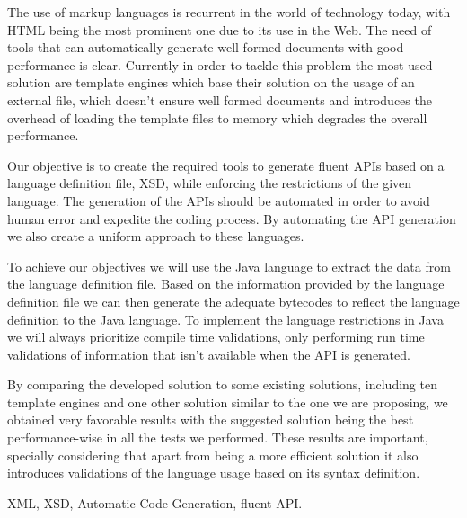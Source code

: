 \abstractEN %

The use of markup languages is recurrent in the world of technology today, with \ac{HTML} being the most prominent one due to its use in the Web. The need of tools that can automatically generate well formed documents with good performance is clear. Currently in order to tackle this problem the most used solution are template engines which base their solution on the usage of an external file, which doesn't ensure well formed documents and introduces the overhead of loading the template files to memory which degrades the overall performance.

\noindent
Our objective is to create the required tools to generate fluent \ac{API}s based on a language definition file, \ac{XSD}, while enforcing the restrictions of the given language. The generation of the \ac{API}s should be automated in order to avoid human error and expedite the coding process. By automating the \ac{API} generation we also create a uniform approach to these languages.  

\noindent
To achieve our objectives we will use the Java language to extract the data from the language definition file. Based on the information provided by the language definition file we can then generate the adequate bytecodes to reflect the language definition to the Java language. To implement the language restrictions in Java we will always prioritize compile time validations, only performing run time validations of information that isn't available when the \ac{API} is generated.

\noindent
By comparing the developed solution to some existing solutions, including ten template engines and one other solution similar to the one we are proposing, we obtained very favorable results with the suggested solution being the best performance-wise in all the tests we performed. These results are important, specially considering that apart from being a more efficient solution it also introduces validations of the language usage based on its syntax definition.

\begin{keywords}
XML, XSD, Automatic Code Generation, fluent API.
\end{keywords} 
